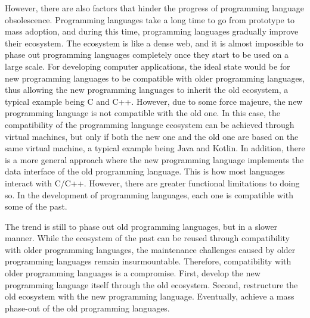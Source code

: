 However, there are also factors that hinder the progress of programming language obsolescence. Programming languages take a long time to go from prototype to mass adoption, and during this time, programming languages gradually improve their ecosystem. The ecosystem is like a dense web, and it is almost impossible to phase out programming languages completely once they start to be used on a large scale. For developing computer applications, the ideal state would be for new programming languages to be compatible with older programming languages, thus allowing the new programming languages to inherit the old ecosystem, a typical example being C and C++. However, due to some force majeure, the new programming language is not compatible with the old one. In this case, the compatibility of the programming language ecosystem can be achieved through virtual machines, but only if both the new one and the old one are based on the same virtual machine, a typical example being Java and Kotlin. In addition, there is a more general approach where the new programming language implements the data interface of the old programming language. This is how most languages interact with C/C++. However, there are greater functional limitations to doing so. In the development of programming languages, each one is compatible with some of the past.

The trend is still to phase out old programming languages, but in a slower manner. While the ecosystem of the past can be reused through compatibility with older programming languages, the maintenance challenges caused by older programming languages remain insurmountable. Therefore, compatibility with older programming languages is a compromise. First, develop the new programming language itself through the old ecosystem. Second, restructure the old ecosystem with the new programming language. Eventually, achieve a mass phase-out of the old programming languages.